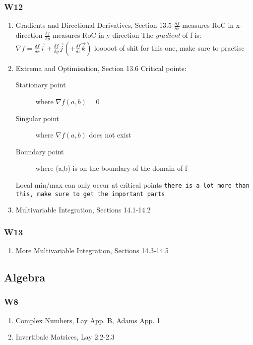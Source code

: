 \documentclass[11pt]{article}
\begin{document}
\subsubsection{W12}
\label{sec-1-1-5}
\begin{enumerate}
\item Gradients and Directional Derivatives, Section 13.5
\label{sec-1-1-5-1}
$\frac{\delta f}{\delta x}$ measures RoC in x-direction
$\frac{\delta f}{\delta y}$ measures RoC in y-direction
The \emph{gradient} of f is:
$\nabla f = \frac{\delta f}{\delta x}\vec{i} + \frac{\delta f}{\delta y}\vec{j} (+\frac{\delta f}{\delta z}\vec{k})$
looooot of shit for this one, make sure to practise
\item Extrema and Optimisation, Section 13.6
\label{sec-1-1-5-2}
Critical points:
\begin{description}
\item[{Stationary point}] where $\nabla f(a,b)=0$
\item[{Singular point}] where $\nabla f(a,b)$ does not exist
\item[{Boundary point}] where (a,b) is on the boundary of the domain of f
\end{description}
Local min/max can only occur at critical points
\texttt{there is a lot more than this, make sure to get the important parts}
\item Multivariable Integration, Sections 14.1-14.2
\label{sec-1-1-5-3}
\end{enumerate}
\subsubsection{W13}
\label{sec-1-1-6}
\begin{enumerate}
\item More Multivariable Integration, Sections 14.3-14.5
\label{sec-1-1-6-1}
\end{enumerate}
\subsection{Algebra}
\label{sec-1-2}
\subsubsection{W8}
\label{sec-1-2-1}
\begin{enumerate}
\item Complex Numbers, Lay App. B, Adams App. 1
\label{sec-1-2-1-1}
\item Invertibale Matrices, Lay 2.2-2.3
\label{sec-1-2-1-2}
\end{enumerate}
\end{document}
